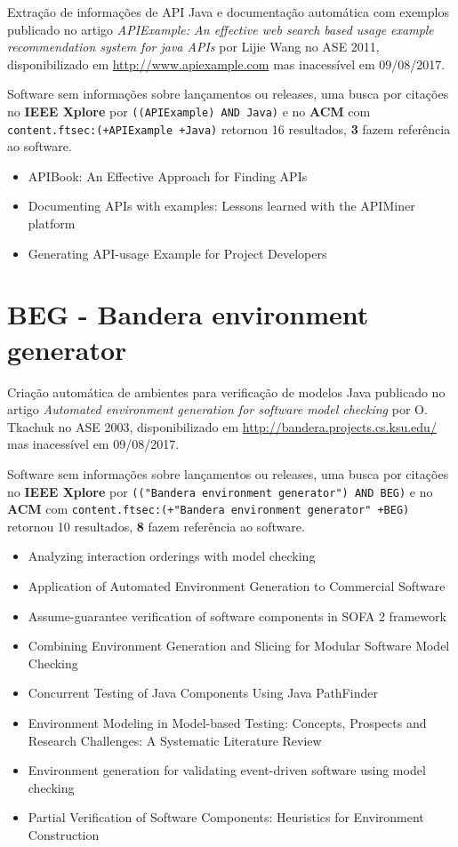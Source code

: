 Extração de informações de API Java e documentação automática com exemplos
publicado no artigo {\it APIExample: An effective web search based usage example recommendation system for java APIs}
por Lijie Wang
no ASE 2011,
disponibilizado em \url{http://www.apiexample.com}
mas inacessível em 09/08/2017.

Software sem informações sobre lançamentos ou releases,
uma busca por citações no {\bf IEEE Xplore} por
\texttt{((APIExample) AND Java)}
e no {\bf ACM} com
\texttt{content.ftsec:(+APIExample +Java)}
retornou
16 resultados,
{\bf 3} fazem referência ao software.

\begin{itemize}
\item APIBook: An Effective Approach for Finding APIs
\item Documenting APIs with examples: Lessons learned with the APIMiner platform
\item Generating API-usage Example for Project Developers
\end{itemize}

\section{BEG - Bandera environment generator}

Criação automática de ambientes para verificação de modelos Java
publicado no artigo {\it Automated environment generation for software model checking}
por O. Tkachuk
no ASE 2003,
disponibilizado em \url{http://bandera.projects.cs.ksu.edu/}
mas inacessível em 09/08/2017.

Software sem informações sobre lançamentos ou releases,
uma busca por citações no {\bf IEEE Xplore} por
\texttt{(("Bandera environment generator") AND BEG)}
e no {\bf ACM} com
\texttt{content.ftsec:(+"Bandera environment generator" +BEG)}
retornou
10 resultados,
{\bf 8} fazem referência ao software.

\begin{itemize}
\item Analyzing interaction orderings with model checking
\item Application of Automated Environment Generation to Commercial Software
\item Assume-guarantee verification of software components in SOFA 2 framework
\item Combining Environment Generation and Slicing for Modular Software Model Checking
\item Concurrent Testing of Java Components Using Java PathFinder
\item Environment Modeling in Model-based Testing: Concepts, Prospects and Research Challenges: A Systematic Literature Review
\item Environment generation for validating event-driven software using model checking
\item Partial Verification of Software Components: Heuristics for Environment Construction
\end{itemize}

